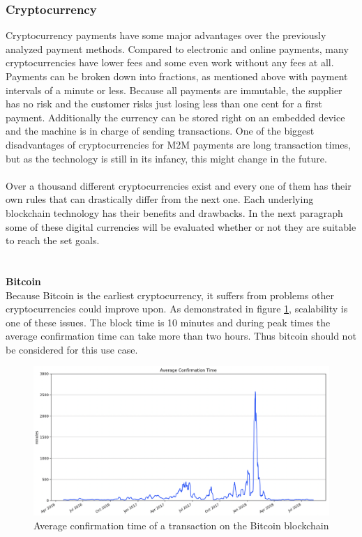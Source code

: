 \subsubsection{Cryptocurrency}
Cryptocurrency payments have some major advantages over the previously analyzed payment methods.
Compared to electronic and online payments, many cryptocurrencies have lower fees and some even work without any fees at all.
Payments can be broken down into fractions, as mentioned above with payment intervals of a minute or less.
Because all payments are immutable, the supplier has no risk and the customer risks just losing less than one cent for a first payment.
Additionally the currency can be stored right on an embedded device and the machine is in charge of sending transactions.
One of the biggest disadvantages of cryptocurrencies for M2M payments are long transaction times, but as the technology is still in its infancy, this might change in the future.
\\\\
Over a thousand different cryptocurrencies exist\cite{coincap} and every one of them has their own rules that can drastically differ from the next one.
Each underlying blockchain technology has their benefits and drawbacks.
In the next paragraph some of these digital currencies will be evaluated whether or not they are suitable to reach the set goals.
\\\\\\
\textbf{Bitcoin}\\
Because Bitcoin is the earliest cryptocurrency, it suffers from problems other cryptocurrencies could improve upon.
As demonstrated in figure \ref{fig:BitcoinConfirmationTime}, scalability is one of these issues.
The block time is 10 minutes\cite{bitcoin-whitepaper} and during peak times the average confirmation time can take more than two hours.
Thus bitcoin should not be considered for this use case.
\\
\begin{figure}[H]
    \includegraphics[width=\textwidth]{img/average-confirmation-time.png}
    \caption{Average confirmation time of a transaction on the Bitcoin blockchain\cite{btc-conf-time}}
    \label{fig:BitcoinConfirmationTime}
\end{figure}
